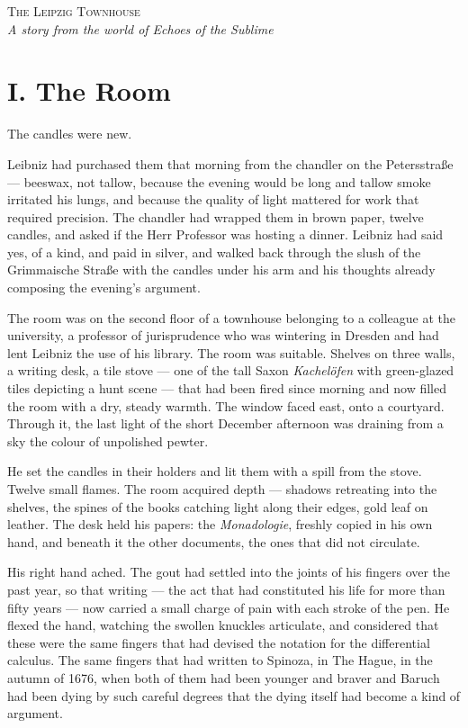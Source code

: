 \begin{center}
{\LARGE\scshape The Leipzig Townhouse}\\[1.5em]
{\large\itshape A story from the world of Echoes of the Sublime}\\[3em]
\end{center}

\section*{I. The Room}

The candles were new.

Leibniz had purchased them that morning from the chandler on the Petersstra\ss e --- beeswax, not tallow, because the evening would be long and tallow smoke irritated his lungs, and because the quality of light mattered for work that required precision. The chandler had wrapped them in brown paper, twelve candles, and asked if the Herr Professor was hosting a dinner. Leibniz had said yes, of a kind, and paid in silver, and walked back through the slush of the Grimmaische Stra\ss e with the candles under his arm and his thoughts already composing the evening's argument.

The room was on the second floor of a townhouse belonging to a colleague at the university, a professor of jurisprudence who was wintering in Dresden and had lent Leibniz the use of his library. The room was suitable. Shelves on three walls, a writing desk, a tile stove --- one of the tall Saxon \emph{Kachel\"ofen} with green-glazed tiles depicting a hunt scene --- that had been fired since morning and now filled the room with a dry, steady warmth. The window faced east, onto a courtyard. Through it, the last light of the short December afternoon was draining from a sky the colour of unpolished pewter.

He set the candles in their holders and lit them with a spill from the stove. Twelve small flames. The room acquired depth --- shadows retreating into the shelves, the spines of the books catching light along their edges, gold leaf on leather. The desk held his papers: the \emph{Monadologie}, freshly copied in his own hand, and beneath it the other documents, the ones that did not circulate.

His right hand ached. The gout had settled into the joints of his fingers over the past year, so that writing --- the act that had constituted his life for more than fifty years --- now carried a small charge of pain with each stroke of the pen. He flexed the hand, watching the swollen knuckles articulate, and considered that these were the same fingers that had devised the notation for the differential calculus. The same fingers that had written to Spinoza, in The Hague, in the autumn of 1676, when both of them had been younger and braver and Baruch had been dying by such careful degrees that the dying itself had become a kind of argument.

